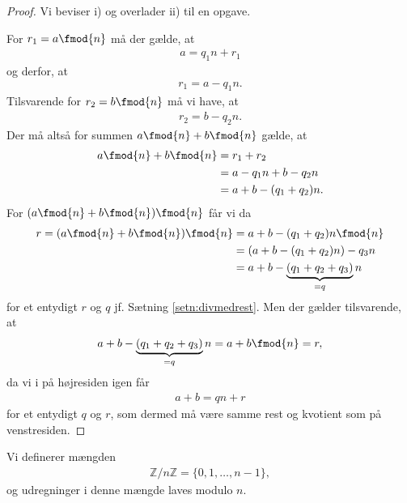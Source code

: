 \begin{proof}
	Vi beviser i) og overlader ii) til en opgave. 
	
	For $r_1 = a \fmod{n}$ må der gælde, at 
	\begin{align*}
		a = q_1n + r_1
	\end{align*}
	og derfor, at 
	\begin{align*}
		r_1 = a - q_1 n.
	\end{align*}
	Tilsvarende for $r_2 = b \fmod{n}$ må vi have, at 
	\begin{align*}
		r_2 = b - q_2 n.
	\end{align*}
	Der må altså for summen $a \fmod{n} + b \fmod{n}$ gælde, at 
	\begin{align*}
		a \fmod{n} + b \fmod{n} &= r_1 + r_2\\
		&= a - q_1 n + b - q_2 n \\
		&= a + b - (q_1 + q_2)n.
	\end{align*}
	For $(a \fmod{n} + b\fmod{n})\fmod{n}$ får vi da
	\begin{align*}
		r = (a \fmod{n} + b\fmod{n})\fmod{n} &= a + b - (q_1 + q_2)n \fmod{n} \\
		&=(a + b - (q_1 + q_2)n) - q_3n\\
		&=a + b -\underbrace{(q_1 + q_2 + q_3)}_{=q}n
	\end{align*}
	for et entydigt $r$ og $q$ jf. Sætning \ref{setn:divmedrest}. Men der gælder tilsvarende, at 
	\begin{align*}
		a + b -\underbrace{(q_1 + q_2 + q_3)}_{=q}n = a + b \fmod{n} = r,
	\end{align*}
	da vi i på højresiden igen får 
	\begin{align*}
		a + b = qn + r
	\end{align*}
	for et entydigt $q$ og $r$, som dermed må være samme rest og kvotient som på venstresiden. 
\end{proof}
\begin{defn}
	Vi definerer mængden 
	\begin{align*}
		\mathbb{Z}/n\mathbb{Z} = \{0,1,\hdots,n-1\},
	\end{align*}
	og udregninger i denne mængde laves modulo $n$.
\end{defn}
